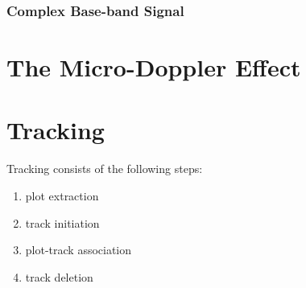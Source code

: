\subsubsection{Complex Base-band Signal}



\section{The Micro-Doppler Effect}


\section{Tracking}

Tracking consists of the following steps:
\begin{enumerate}
    \item plot extraction
    \item track initiation
    \item plot-track association
    \item track deletion
\end{enumerate}